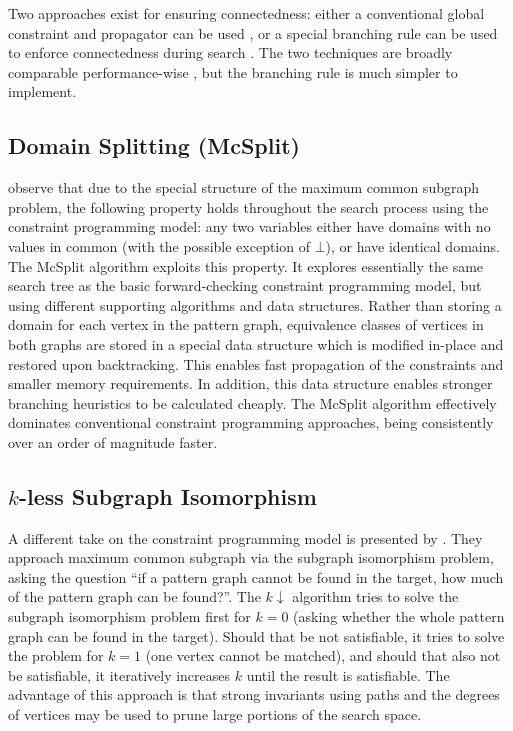 \documentclass[sigconf]{acmart}
\begin{document}
Two approaches exist for ensuring connectedness: either a conventional global constraint and
propagator can be used \citep{DBLP:conf/cp/McCreeshNPS16}, or a special branching rule can be used
to enforce connectedness during search \citep{DBLP:conf/mco/VismaraV08}. The two techniques are
broadly comparable performance-wise \citep{DBLP:conf/cp/McCreeshNPS16}, but the branching rule is
much simpler to implement.

\subsection{Domain Splitting (McSplit)}

\citet{o:McCreeshPT17} observe that due to the special structure of the maximum common subgraph
problem, the following property holds throughout the search process using the constraint programming
model: any two variables either have domains with no values in common (with the possible exception
of $\bot$), or have identical domains. The McSplit algorithm exploits this property. It explores
essentially the same search tree as the basic forward-checking constraint programming model, but
using different supporting algorithms and data structures.  Rather than storing a domain for each
vertex in the pattern graph, equivalence classes of vertices in both graphs are stored in a special
data structure which is modified in-place and restored upon backtracking. This enables fast
propagation of the constraints and smaller memory requirements. In addition, this data structure
enables stronger branching heuristics to be calculated cheaply. The McSplit algorithm effectively
dominates conventional constraint programming approaches, being consistently over an order of
magnitude faster.

\subsection{$k$-less Subgraph Isomorphism}

A different take on the constraint programming model is presented by
\citet{DBLP:conf/aaai/HoffmannMR17}. They approach maximum common subgraph via the
subgraph isomorphism problem, asking the question ``if a pattern graph cannot be found in the
target, how much of the pattern graph can be found?''. The $k{\downarrow}$ algorithm tries to solve
the subgraph isomorphism problem first for $k=0$ (asking whether the whole pattern graph can be found in the
target). Should that be not satisfiable, it tries to solve the problem for $k=1$ (one vertex cannot
be matched), and should that also not be satisfiable, it iteratively increases $k$ until the result
is satisfiable. The advantage of this approach is that strong invariants using paths and the degrees
of vertices may be used to prune large portions of the search space.
\end{document}
